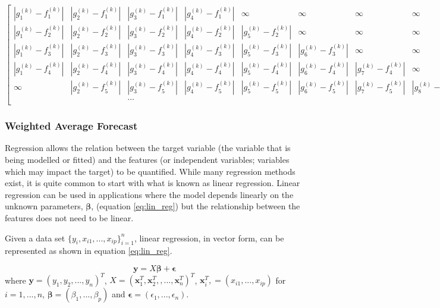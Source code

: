 \documentclass[a4paper]{article}
\begin{document}
\centerline{$\begin{bmatrix}
    |g_1^{(k)} - f_1^{(k)}| & |g_2^{(k)} - f_1^{(k)}| & |g_3^{(k)} - f_1^{(k)}| & |g_4^{(k)} -f_1^{(k)}| & \infty  & \infty& \infty & \infty & \dots & \infty \\
    |g_1^{(k)} - f_2^{(k)}| & |g_2^{(k)} - f_2^{(k)}| & |g_3^{(k)} - f_2^{(k)}| &  |g_4^{(k)} - f_2^{(k)}| & |g_5^{(k)} - f_2^{(k)}| & \infty & \infty &\infty & \dots & \infty\\
    |g_1^{(k)} - f_3^{(k)}| & |g_2^{(k)} - f_3^{(k)}| & |g_3^{(k)} - f_3^{(k)}| &  |g_4^{(k)} - f_3^{(k)}|& |g_5^{(k)}- f_3^{(k)}| & |g_6^{(k)}-f_3^{(k)}| & \infty & \infty & \dots  & \infty\\
    |g_1^{(k)}-f_4^{(k)}| & |g_2^{(k)} - f_4^{(k)}| & |g_3^{(k)} - f_4^{(k)}| & |g_4^{(k)} - f_4^{(k)}| &  |g_5^{(k)} - f_4^{(k)}| & |g_6^{(k)}- f_4^{(k)}|& |g_7^{(k)} - f_4^{(k)}| &\infty &\dots & \infty\\
    \infty & |g_2^{(k)} - f_5^{(k)}| & |g_3^{(k)} - f_5^{(k)}| & |g_4^{(k)} - f_5^{(k)}| &  |g_5^{(k)} - f_5^{(k)}|& |g_6^{(k)}- f_5^{(k)}|& |g_7^{(k)} - f_5^{(k)}| &|g_8^{(k)} - f_5^{(k)}| &\dots & \infty\\
     &  & \dots &  & &  & &  & \\
\end{bmatrix}$}


\subsubsection{Weighted Average Forecast} \label{subsubsec:linregforecast}
Regression allows the relation between the target variable (the variable that is being modelled or fitted) and the features (or independent variables; variables which may impact the target) to be quantified. While many regression methods exist, it is quite common to start with what is known as linear regression. Linear regression can be used in applications where the model depends linearly on the unknown parameters, $\boldsymbol \beta$, (equation \ref{eq:lin_reg}) but the relationship between the features does not need to be linear.

Given a data set $\{y_i, x_{i1}, ... , x_{ip}\}_{i=1}^n$, linear regression, in vector form, can be represented as shown in equation \ref{eq:lin_reg}.

\begin{equation} \label{eq:lin_reg}
\textbf{y} = X \boldsymbol \beta +\boldsymbol \epsilon
\end{equation}
where $\textbf{y} = (y_1, y_2, ... , y_n)^T $, $X =  (\textbf{x}_1^T, \textbf{x}_2^T,, ... ,\textbf{x}_n^T)^T$,  $\textbf{x}_i^T, = (x_{i1}, ... , x_{ip})$ for $i = 1, ... , n$, $\boldsymbol \beta = (\beta_1 , ... , \beta_p)$ and $\boldsymbol \epsilon = (\epsilon_1, ... , \epsilon_n)$.
\end{document}

